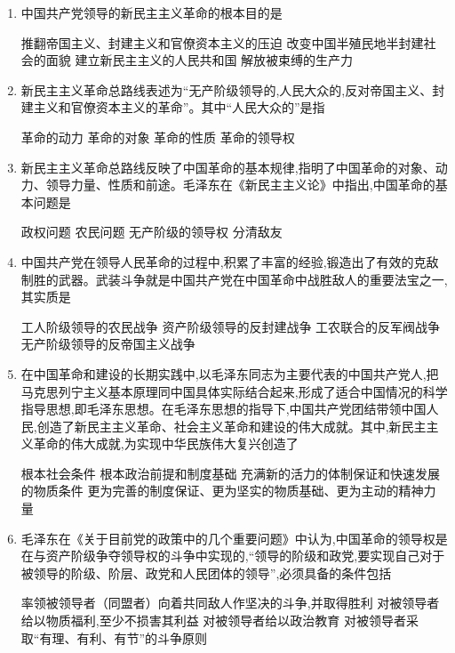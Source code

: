 \documentclass[12pt, a4paper, oneside, UTF8]{ctexbook}
\begin{document}
\begin{enumerate}
    
    \item 中国共产党领导的新民主主义革命的根本目的是
    \begin{choices}[1]
    \task 推翻帝国主义、封建主义和官僚资本主义的压迫
    \task 改变中国半殖民地半封建社会的面貌
    \task 建立新民主主义的人民共和国
    \task 解放被束缚的生产力
    \end{choices}

    
    \item 新民主主义革命总路线表述为“无产阶级领导的,人民大众的,反对帝国主义、封建主义和官僚资本主义的革命”。其中“人民大众的”是指
    \begin{choices}[2]
    \task 革命的动力
    \task 革命的对象
    \task 革命的性质
    \task 革命的领导权
    \end{choices}

    
    \item 新民主主义革命总路线反映了中国革命的基本规律,指明了中国革命的对象、动力、领导力量、性质和前途。毛泽东在《新民主主义论》中指出,中国革命的基本问题是
    \begin{choices}[2]
    \task 政权问题
    \task 农民问题
    \task 无产阶级的领导权
    \task 分清敌友
    \end{choices}

    
    \item 中国共产党在领导人民革命的过程中,积累了丰富的经验,锻造出了有效的克敌制胜的武器。武装斗争就是中国共产党在中国革命中战胜敌人的重要法宝之一,其实质是
    \begin{choices}[1]
    \task 工人阶级领导的农民战争
    \task 资产阶级领导的反封建战争
    \task 工农联合的反军阀战争
    \task 无产阶级领导的反帝国主义战争
    \end{choices}

    
    \item 在中国革命和建设的长期实践中,以毛泽东同志为主要代表的中国共产党人,把马克思列宁主义基本原理同中国具体实际结合起来,形成了适合中国情况的科学指导思想,即毛泽东思想。在毛泽东思想的指导下,中国共产党团结带领中国人民,创造了新民主主义革命、社会主义革命和建设的伟大成就。其中,新民主主义革命的伟大成就,为实现中华民族伟大复兴创造了
    \begin{choices}[1]
    \task 根本社会条件
    \task 根本政治前提和制度基础
    \task 充满新的活力的体制保证和快速发展的物质条件
    \task 更为完善的制度保证、更为坚实的物质基础、更为主动的精神力量
    \end{choices}

    
    \item 毛泽东在《关于目前党的政策中的几个重要问题》中认为,中国革命的领导权是在与资产阶级争夺领导权的斗争中实现的,“领导的阶级和政党,要实现自己对于被领导的阶级、阶层、政党和人民团体的领导”,必须具备的条件包括
    \begin{choices}[1]
    \task 率领被领导者（同盟者）向着共同敌人作坚决的斗争,并取得胜利
    \task 对被领导者给以物质福利,至少不损害其利益
    \task 对被领导者给以政治教育
    \task 对被领导者采取“有理、有利、有节”的斗争原则
    \end{choices}


\end{enumerate}
\end{document}
